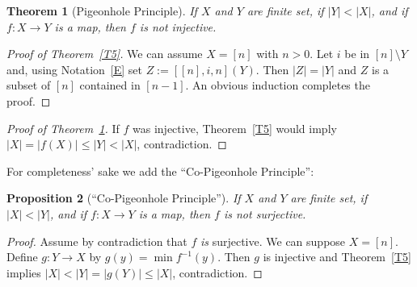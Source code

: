 \documentclass[12pt,letterpaper]{article}
\newtheorem{thm}{Theorem}%
\newtheorem{prop}[thm]{Proposition}
\begin{document}
\begin{thm}[Pigeonhole Principle]\label{T6}
If $X$ and $Y$ are finite set, if $|Y|<|X|$, and if $f:X\to Y$ is a map, then $f$ is \emph{not} injective. 
\end{thm} 

\begin{proof}[Proof of Theorem~\ref{T5}] 
We can assume $X=[n]$ with $n>0$. Let $i$ be in $[n]\setminus Y$ and, using Notation~\eqref{E} set $Z:=[[n],i,n](Y)$. Then $|Z|=|Y|$ and $Z$ is a subset of $[n]$ contained in $[n-1]$. An obvious induction completes the proof. 
\end{proof} 

\begin{proof}[Proof of Theorem~\ref{T6}] 
If $f$ was injective, Theorem~\ref{T5} would imply $|X|=|f(X)|\le|Y|<|X|$, contradiction.
\end{proof} 

For completeness' sake we add the ``Co-Pigeonhole Principle'': 

\begin{prop}[``Co-Pigeonhole Principle'']%
If $X$ and $Y$ are finite set, if $|X|<|Y|$, and if $f:X\to Y$ is a map, then $f$ is \emph{not} surjective. 
\end{prop} 

\begin{proof} 
Assume by contradiction that $f$ \emph{is} surjective. We can suppose $X=[n]$. Define $g:Y\to X$ by $g(y)=\min f^{-1}(y)$.  Then $g$ is injective and Theorem~\ref{T5} implies $|X|<|Y|=|g(Y)|\le|X|$, contradiction. 
\end{proof} 
\end{document}
